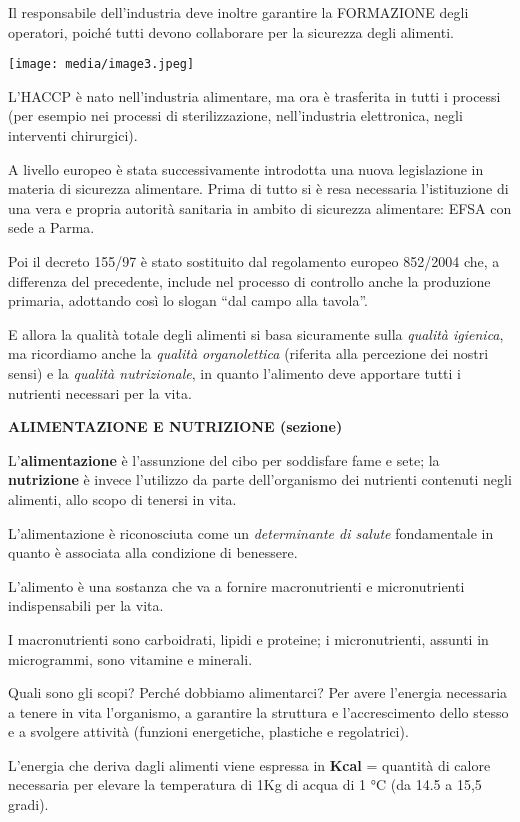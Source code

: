 \documentclass[]{article}
\begin{document}
Il responsabile dell'industria deve inoltre garantire la FORMAZIONE
degli operatori, poiché tutti devono collaborare per la sicurezza degli
alimenti.

\texttt{[image: media/image3.jpeg]}

L'HACCP è nato nell'industria alimentare, ma ora è trasferita in tutti i
processi (per esempio nei processi di sterilizzazione, nell'industria
elettronica, negli interventi chirurgici).

A livello europeo è stata successivamente introdotta una nuova
legislazione in materia di sicurezza alimentare. Prima di tutto si è
resa necessaria l'istituzione di una vera e propria autorità sanitaria
in ambito di sicurezza alimentare: EFSA con sede a Parma.

Poi il decreto 155/97 è stato sostituito dal regolamento europeo
852/2004 che, a differenza del precedente, include nel processo di
controllo anche la produzione primaria, adottando così lo slogan ``dal
campo alla tavola''.

E allora la qualità totale degli alimenti si basa sicuramente sulla
\emph{qualità igienica}, ma ricordiamo anche la \emph{qualità
organolettica} (riferita alla percezione dei nostri sensi) e la
\emph{qualità nutrizionale}, in quanto l'alimento deve apportare tutti i
nutrienti necessari per la vita.

\textbf{ALIMENTAZIONE E NUTRIZIONE (sezione)}

L'\textbf{alimentazione} è l'assunzione del cibo per soddisfare fame e
sete; la \textbf{nutrizione} è invece l'utilizzo da parte dell'organismo
dei nutrienti contenuti negli alimenti, allo scopo di tenersi in vita.

L'alimentazione è riconosciuta come un \emph{determinante di salute}
fondamentale in quanto è associata alla condizione di benessere.

L'alimento è una sostanza che va a fornire macronutrienti e
micronutrienti indispensabili per la vita.

I macronutrienti sono carboidrati, lipidi e proteine; i micronutrienti,
assunti in microgrammi, sono vitamine e minerali.

Quali sono gli scopi? Perché dobbiamo alimentarci? Per avere l'energia
necessaria a tenere in vita l'organismo, a garantire la struttura e
l'accrescimento dello stesso e a svolgere attività (funzioni
energetiche, plastiche e regolatrici).

L'energia che deriva dagli alimenti viene espressa in \textbf{Kcal} =
quantità di calore necessaria per elevare la temperatura di 1Kg di acqua
di 1 °C (da 14.5 a 15,5 gradi).
\end{document}
